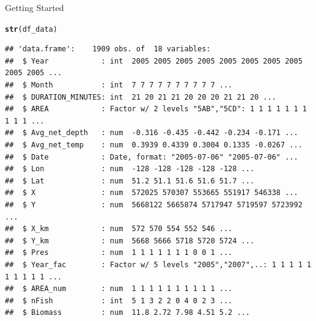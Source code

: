 \documentclass{beamer}\usepackage[]{graphicx}\usepackage[]{color}
\makeatletter
\newcommand{\hlstd}[1]{\textcolor[rgb]{0.345,0.345,0.345}{#1}}%
\newcommand{\hlkwd}[1]{\textcolor[rgb]{0.737,0.353,0.396}{\textbf{#1}}}%
\newenvironment{kframe}{%
 \def\at@end@of@kframe{}%
 \ifinner\ifhmode%
  \def\at@end@of@kframe{\end{minipage}}%
  \begin{minipage}{\columnwidth}%
 \fi\fi%
 \def\FrameCommand##1{\hskip\@totalleftmargin \hskip-\fboxsep
 \colorbox{shadecolor}{##1}\hskip-\fboxsep
     \hskip-\linewidth \hskip-\@totalleftmargin \hskip\columnwidth}%
 \MakeFramed {\advance\hsize-\width
   \@totalleftmargin\z@ \linewidth\hsize
   \@setminipage}}%
 {\par\unskip\endMakeFramed%
 \at@end@of@kframe}
\newenvironment{knitrout}{}{} %
\makeatother
\begin{document}
\begin{frame}[fragile]{Getting Started}
\begin{knitrout}\scriptsize
{}\color{fgcolor}\begin{kframe}
\begin{alltt}
  \hlkwd{str}\hlstd{(df_data)}
\end{alltt}
\begin{verbatim}
## 'data.frame':	1909 obs. of  18 variables:
##  $ Year            : int  2005 2005 2005 2005 2005 2005 2005 2005 2005 2005 ...
##  $ Month           : int  7 7 7 7 7 7 7 7 7 7 ...
##  $ DURATION_MINUTES: int  21 20 21 21 20 20 20 21 21 20 ...
##  $ AREA            : Factor w/ 2 levels "5AB","5CD": 1 1 1 1 1 1 1 1 1 1 ...
##  $ Avg_net_depth   : num  -0.316 -0.435 -0.442 -0.234 -0.171 ...
##  $ Avg_net_temp    : num  0.3939 0.4339 0.3004 0.1335 -0.0267 ...
##  $ Date            : Date, format: "2005-07-06" "2005-07-06" ...
##  $ Lon             : num  -128 -128 -128 -128 -128 ...
##  $ Lat             : num  51.2 51.1 51.6 51.6 51.7 ...
##  $ X               : num  572025 570307 553665 551917 546338 ...
##  $ Y               : num  5668122 5665874 5717947 5719597 5723992 ...
##  $ X_km            : num  572 570 554 552 546 ...
##  $ Y_km            : num  5668 5666 5718 5720 5724 ...
##  $ Pres            : num  1 1 1 1 1 1 1 0 0 1 ...
##  $ Year_fac        : Factor w/ 5 levels "2005","2007",..: 1 1 1 1 1 1 1 1 1 1 ...
##  $ AREA_num        : num  1 1 1 1 1 1 1 1 1 1 ...
##  $ nFish           : int  5 1 3 2 2 0 4 0 2 3 ...
##  $ Biomass         : num  11.8 2.72 7.98 4.51 5.2 ...
\end{verbatim}
\end{kframe}
\end{knitrout}
\end{frame}

\end{document}
